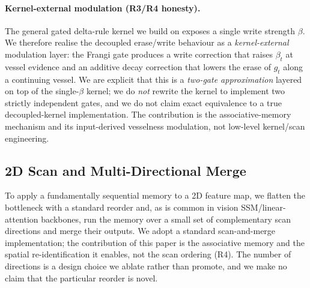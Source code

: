 \paragraph{Kernel-external modulation (R3/R4 honesty).}
The general gated delta-rule kernel we build on exposes a single write strength
$\beta$. We therefore realise the decoupled erase/write behaviour as a
\emph{kernel-external} modulation layer: the Frangi gate produces a write correction
that raises $\beta_t$ at vessel evidence and an additive decay correction that lowers
the erase of $g_t$ along a continuing vessel. We are explicit that this is a
\emph{two-gate approximation} layered on top of the single-$\beta$ kernel; we do
\emph{not} rewrite the kernel to implement two strictly independent gates, and we do
not claim exact equivalence to a true decoupled-kernel implementation. The
contribution is the associative-memory mechanism and its input-derived vesselness
modulation, not low-level kernel/scan engineering.

\subsection{2D Scan and Multi-Directional Merge}
\label{sec:method:scan}

To apply a fundamentally sequential memory to a 2D feature map, we flatten the
bottleneck with a standard reorder and, as is common in vision SSM/linear-attention
backbones, run the memory over a small set of complementary scan directions and merge
their outputs. We adopt a standard scan-and-merge implementation; the contribution of
this paper is the associative memory and the spatial re-identification it enables, not
the scan ordering (R4). The number of directions is a design choice we ablate rather
than promote, and we make no claim that the particular reorder is novel.
